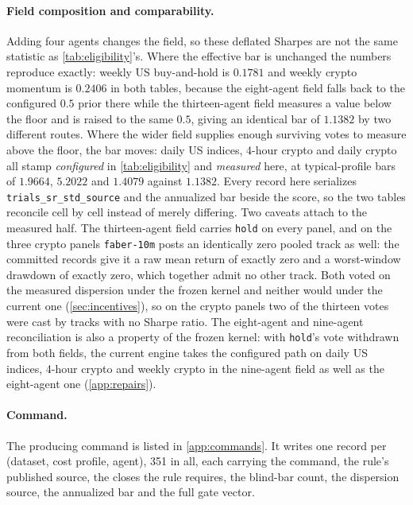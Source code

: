 \paragraph{Field composition and comparability.} Adding four agents changes the field, so these deflated Sharpes are not the same statistic as \cref{tab:eligibility}'s. Where the effective bar is unchanged the numbers reproduce exactly: weekly US buy-and-hold is $0.1781$ and weekly crypto momentum is $0.2406$ in both tables, because the eight-agent field falls back to the configured $0.5$ prior there while the thirteen-agent field measures a value below the floor and is raised to the same $0.5$, giving an identical bar of $1.1382$ by two different routes. Where the wider field supplies enough surviving votes to measure above the floor, the bar moves: daily US indices, 4-hour crypto and daily crypto all stamp \emph{configured} in \cref{tab:eligibility} and \emph{measured} here, at typical-profile bars of $1.9664$, $5.2022$ and $1.4079$ against $1.1382$. Every record here serializes \texttt{trials\_sr\_std\_source} and the annualized bar beside the score, so the two tables reconcile cell by cell instead of merely differing. Two caveats attach to the measured half. The thirteen-agent field carries \texttt{hold} on every panel, and on the three crypto panels \texttt{faber-10m} posts an identically zero pooled track as well: the committed records give it a raw mean return of exactly zero and a worst-window drawdown of exactly zero, which together admit no other track. Both voted on the measured dispersion under the frozen kernel and neither would under the current one (\cref{sec:incentives}), so on the crypto panels two of the thirteen votes were cast by tracks with no Sharpe ratio. The eight-agent and nine-agent reconciliation is also a property of the frozen kernel: with \texttt{hold}'s vote withdrawn from both fields, the current engine takes the configured path on daily US indices, 4-hour crypto and weekly crypto in the nine-agent field as well as the eight-agent one (\cref{app:repairs}).

\paragraph{Command.} The producing command is listed in \cref{app:commands}. It writes one record per (dataset, cost profile, agent), 351 in all, each carrying the command, the rule's published source, the closes the rule requires, the blind-bar count, the dispersion source, the annualized bar and the full gate vector.


